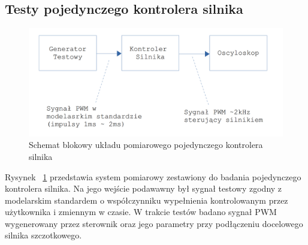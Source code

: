 \subsection{Testy pojedynczego kontrolera silnika}

\begin{figure}[H]
	\centering
	\includegraphics[scale=0.2]{Pictures/TestyKontroleraSilnikow.png}
	\caption[Schemat blokowy układu pomiarowego pojedynczego kontrolera silnika]{Schemat blokowy układu pomiarowego pojedynczego kontrolera silnika}
	\label{fig:MotorController_test_single}
\end{figure}

Rysynek ~\ref{fig:MotorController_test_single} przedstawia system pomiarowy zestawiony do badania pojedynczego kontrolera silnika. Na jego wejście podawawny był sygnał testowy zgodny z modelarskim standardem o współczynniku wypełnienia kontrolowanym przez użytkownika i zmiennym w czasie. W trakcie testów badano sygnał PWM wygenerowany przez sterownik oraz jego parametry przy podłączeniu docelowego silnika szczotkowego.


